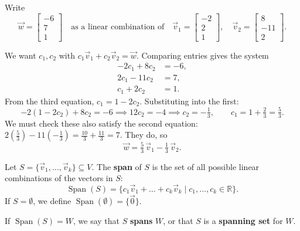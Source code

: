 \begin{example}
Write
\[
\vec{w} = \begin{bmatrix} -6 \\ 7 \\ 1 \end{bmatrix}
\quad \text{as a linear combination of} \quad
\vec{v}_1 = \begin{bmatrix} -2 \\ 2 \\ 1 \end{bmatrix}, \quad
\vec{v}_2 = \begin{bmatrix} 8 \\ -11 \\ 2 \end{bmatrix}.
\]

\begin{solution}
We want $c_1, c_2$ with $c_1\vec{v}_1 + c_2\vec{v}_2 = \vec{w}$. Comparing entries gives the system
\begin{align*}
-2c_1 + 8c_2 &= -6, \\
2c_1 - 11c_2 &= 7, \\
c_1 + 2c_2 &= 1.
\end{align*}
From the third equation, $c_1 = 1 - 2c_2$. Substituting into the first:
\[
-2(1 - 2c_2) + 8c_2 = -6 \implies 12c_2 = -4 \implies c_2 = -\tfrac{1}{3}, \qquad c_1 = 1 + \tfrac{2}{3} = \tfrac{5}{3}.
\]
We must check these also satisfy the second equation: $2\left(\tfrac{5}{3}\right) - 11\left(-\tfrac{1}{3}\right) = \tfrac{10}{3} + \tfrac{11}{3} = 7$. They do, so
\[
\vec{w} = \tfrac{5}{3}\,\vec{v}_1 - \tfrac{1}{3}\,\vec{v}_2.
\]
\end{solution}
\end{example}

\begin{definition}[Span]
Let $S = \{\vec{v}_1, \dots, \vec{v}_k\} \subseteq V$. The \textbf{span} of $S$ is the set of all possible linear combinations of the vectors in $S$:
\[
\operatorname{Span}(S) = \{ c_1\vec{v}_1 + \dots + c_k\vec{v}_k \mid c_1, \dots, c_k \in \mathbb{R} \}.
\]
If $S = \emptyset$, we define $\operatorname{Span}(\emptyset) = \{\vec{0}\}$.

\medskip
If $\operatorname{Span}(S) = W$, we say that $S$ \textbf{spans} $W$, or that $S$ is a \textbf{spanning set} for $W$.
\end{definition}

